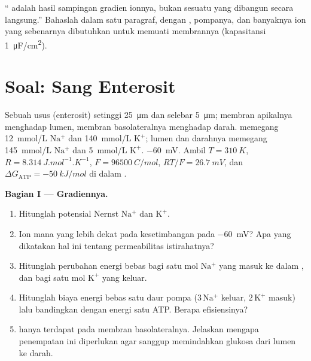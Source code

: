 \begin{exercise}[$\star\star\star$]\label{exo:b1:membranes-transport:12}
`` adalah hasil sampingan gradien ionnya, bukan sesuatu
yang dibangun  secara langsung.'' Bahaslah dalam satu paragraf,
dengan , pompanya, dan banyaknya ion yang sebenarnya
dibutuhkan untuk memuati membrannya (kapasitansi \qty{1}{\micro F/cm^2}).
\end{exercise}

\section{Soal: Sang Enterosit}

\begin{problem}
\label{pb:b1:membranes-transport:1}
Sebuah   usus (enterosit) setinggi \qty{25}{\micro m} dan
selebar \qty{5}{\micro m}; membran apikalnya menghadap lumen, membran
basolateralnya menghadap darah.  memegang \qty{12}{mmol/L}
$\mathrm{Na^+}$ dan \qty{140}{mmol/L} $\mathrm{K^+}$; lumen dan darahnya
memegang \qty{145}{mmol/L} $\mathrm{Na^+}$ dan \qty{5}{mmol/L}
$\mathrm{K^+}$.  \qty{-60}{mV}. Ambil
$T = \qty{310}{K}$, $R = \qty{8.314}{J.mol^{-1}.K^{-1}}$,
$F = \qty{96500}{C/mol}$, $RT/F = \qty{26.7}{mV}$, dan
$\Delta G_{\text{ATP}} = \qty{-50}{kJ/mol}$ di dalam .

\medskip
\noindent\textbf{Bagian I --- Gradiennya.}
\begin{enumerate}
  \item Hitunglah potensial Nernst $\mathrm{Na^+}$ dan
        $\mathrm{K^+}$.
  \item Ion mana yang lebih dekat pada kesetimbangan pada
        \qty{-60}{mV}? Apa yang dikatakan hal ini tentang permeabilitas
        istirahatnya?
  \item Hitunglah perubahan energi bebas bagi satu mol $\mathrm{Na^+}$
        yang masuk ke dalam , dan bagi satu mol $\mathrm{K^+}$
        yang keluar.
  \item Hitunglah biaya energi bebas satu daur pompa ($3\,\mathrm{Na^+}$
        keluar, $2\,\mathrm{K^+}$ masuk) lalu bandingkan dengan energi
        satu ATP. Berapa efisiensinya?
  \item {} hanya terdapat pada membran basolateralnya. Jelaskan
        mengapa penempatan ini diperlukan agar  sanggup
        memindahkan glukosa dari lumen ke darah.
\end{enumerate}


\end{problem}
